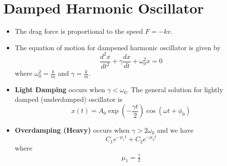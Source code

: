 \section{Damped Harmonic Oscillator}
\begin{itemize}
    \item The drag force is proportional to the speed $F = -kv$.
    \item The equation of motion for dampened harmonic oscillator is given by 
    \begin{equation}
        \frac{d^2x}{dt^2}+\gamma \frac{dx}{dt} + \omega_0^2 x = 0
    \end{equation}
    where $\omega_0^2 = \frac{k}{m}$ and $\gamma = \frac{k}{m}.$
    \item \textbf{Light Damping} occurs when $\gamma < \omega_0$.  The general solution for lightly damped (underdamped) oscillator is 
    \begin{equation}
        x(t) = A_0 \exp\left(-\frac{\gamma t}{2}\right)\cos(\omega t + \phi_0)
    \end{equation}
    \item \textbf{Overdamping (Heavy)} occurs when $\gamma > 2\omega_0$ and we have
    \begin{equation}
        C_1 e^{-\mu_1 t} + C_2 e^{-\mu_2 t}
    \end{equation}
    where 
    \begin{align}
        \mu_1 = \frac{\gamma}{2}
    \end{align}
\end{itemize}